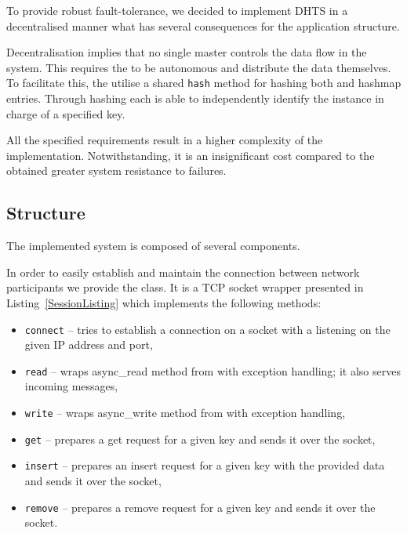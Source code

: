         To provide robust fault-tolerance, we decided to implement DHTS in a decentralised manner what has several consequences for the application structure.
    
        Decentralisation implies that no single master controls the data flow in the system.
        This requires the \Nodes to be autonomous and distribute the data themselves.
        To facilitate this, the \Nodes utilise a shared \texttt{hash} method for hashing both \Nodes and hashmap entries.
        Through hashing each \Node is able to independently identify the instance in charge of a specified key.
        
        All the specified requirements result in a higher complexity of the \Node implementation.
        Notwithstanding, it is an insignificant cost compared to the obtained greater system resistance to failures.

    \subsection{Structure}  %
        The implemented system is composed of several components.

        In order to easily establish and maintain the connection between network participants we provide the \Session class.
        It is a TCP socket wrapper presented in Listing~\ref{SessionListing} which implements the following methods:
        
        \begin{itemize}
            \item \texttt{connect} -- tries to establish a connection on a socket with a \Node listening on the given IP address and port,
            \item \texttt{read} -- wraps async\_read method from \Asio with exception handling; it also serves incoming messages,
            \item \texttt{write} -- wraps async\_write method from \Asio with exception handling,
            \item \texttt{get} -- prepares a get request for a given key and sends it over the socket,
            \item \texttt{insert} -- prepares an insert request for a given key with the provided data and sends it over the socket,
            \item \texttt{remove} -- prepares a remove request for a given key and sends it over the socket.
        \end{itemize}

